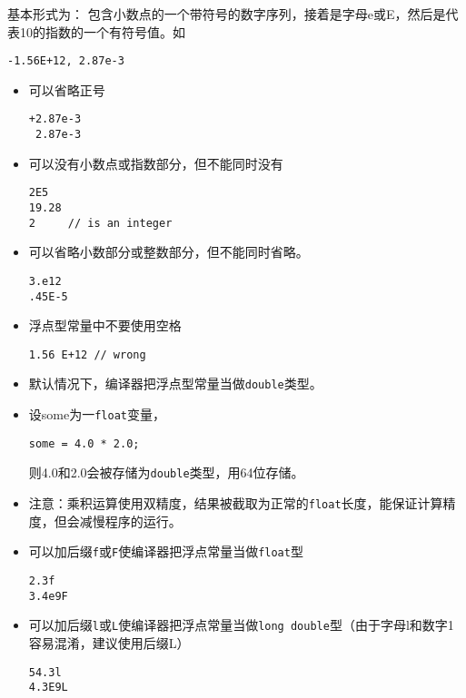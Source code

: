 \begin{frame}[fragile]
基本形式为：
包含小数点的一个带符号的数字序列，接着是字母e或E，然后是代表10的指数的一个有符号值。如
\begin{lstlisting}
-1.56E+12, 2.87e-3
\end{lstlisting}
\end{frame}
%
\begin{frame}[fragile]
\begin{itemize}
\item 可以省略正号
\begin{lstlisting}
+2.87e-3
 2.87e-3
\end{lstlisting}
\item 可以没有小数点或指数部分，但不能同时没有
\begin{lstlisting}
2E5
19.28
2     // is an integer
\end{lstlisting}
\item 可以省略小数部分或整数部分，但不能同时省略。
\begin{lstlisting}
3.e12
.45E-5
\end{lstlisting}
\end{itemize}
\end{frame}
%
\begin{frame}[fragile]
\begin{itemize}
\item 浮点型常量中不要使用空格
\begin{lstlisting}
1.56 E+12 // wrong
\end{lstlisting}
\item 默认情况下，编译器把浮点型常量当做\lstinline|double|类型。\\[0.1in]
\item[] 设some为一\lstinline|float|变量，
\begin{lstlisting}
some = 4.0 * 2.0;
\end{lstlisting}
则4.0和2.0会被存储为\lstinline|double|类型，用64位存储。
\\[0.1in]
\item[] 注意：乘积运算使用双精度，结果被截取为正常的\lstinline|float|长度，能保证计算精度，但会减慢程序的运行。
\end{itemize}
\end{frame}
%
\begin{frame}[fragile]
\begin{itemize}
\item 可以加后缀\lstinline|f|或\lstinline|F|使编译器把浮点常量当做\lstinline|float|型
\begin{lstlisting}
2.3f
3.4e9F
\end{lstlisting}
\item 可以加后缀\lstinline|l|或\lstinline|L|使编译器把浮点常量当做\lstinline|long double|型（由于字母l和数字1容易混淆，建议使用后缀L）
\begin{lstlisting}
54.3l
4.3E9L
\end{lstlisting}
\end{itemize}
\end{frame}

